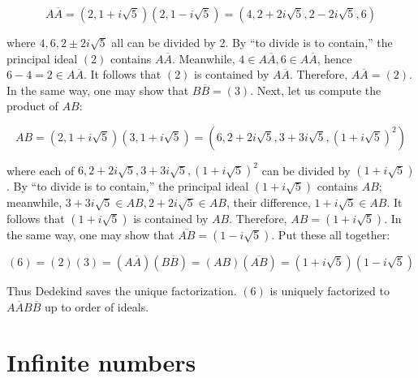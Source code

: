 \documentclass[b5paper]{article}
\begin{document}
\[
A\overline{A} = (2, 1 + i\sqrt{5})(2, 1 - i\sqrt{5}) = (4, 2 + 2i\sqrt{5}, 2 - 2i\sqrt{5}, 6)
\]

where $4, 6, 2 \pm 2i\sqrt{5}$ all can be divided by 2. By \enquote{to divide is to contain,} the principal ideal $(2)$ contains $A\overline{A}$. Meanwhile, $4 \in A\overline{A}, 6 \in A\overline{A}$, hence $6 - 4 = 2 \in A\overline{A}$. It follows that $(2)$ is contained by  $A\overline{A}$. Therefore, $A\overline{A} = (2)$. In the same way, one may show that $B\overline{B} = (3)$. Next, let us compute the product of $AB$:

\[
AB = (2, 1 + i\sqrt{5})(3, 1 + i\sqrt{5}) = (6, 2 + 2i\sqrt{5}, 3 + 3i\sqrt{5}, (1 + i\sqrt{5})^2)
\]

where each of $6, 2 + 2i\sqrt{5}, 3 + 3i\sqrt{5}, (1 + i\sqrt{5})^2$ can be divided by $(1 + i\sqrt{5})$. By \enquote{to divide is to contain,} the principal ideal $(1 + i\sqrt{5})$ contains $AB$; meanwhile, $3 + 3i\sqrt{5} \in AB, 2 + 2i\sqrt{5} \in AB$, their difference, $1 + i\sqrt{5} \in AB$. It follows that $(1 + i\sqrt{5})$ is contained by $AB$. Therefore, $AB = (1 + i\sqrt{5})$. In the same way, one may show that $\overline{AB} = (1 - i\sqrt{5})$. Put these all together:

\[
(6) = (2)(3) = (A\overline{A})(B\overline{B}) = (AB)(\overline{AB}) = (1 + i\sqrt{5})(1 - i\sqrt{5})
\]

Thus Dedekind saves the unique factorization. $(6)$ is uniquely factorized to $A\overline{A}B\overline{B}$ up to order of ideals.

\section{Infinite numbers}
\end{document}
